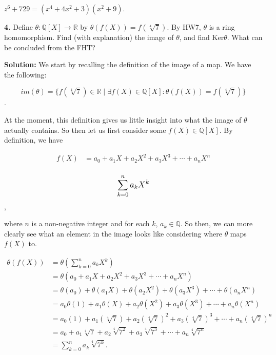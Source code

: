 \documentclass[12pt, a4paper]{article}
\begin{document}
\vspace{2mm}

\centerline{$z^6+729=(x^4+4x^2+3)(x^2+9)$.}

\newpage

\noindent\textbf{4.} Define $\theta\colon\mathbb{Q}[X]\rightarrow\mathbb{R}$ by $\theta(f(X))=f(\sqrt[4]{7})$. By HW7, $\theta$ is a ring homomorphism. Find (with explanation) the image of $\theta$, and find Ker$\theta$. What can be concluded from the FHT?

\vspace{4mm}

\noindent\textbf{Solution:} We start by recalling the definition of the image of a map. We have the following:

\vspace{2mm}

\centerline{\[ im(\theta)=\{f(\sqrt[4]{7})\in\mathbb{R}\mid\exists f(X)\in\mathbb{Q}[X]\colon\theta(f(X))=f(\sqrt[4]{7})\} \].}

\vspace{2mm}

At the moment, this definition gives us little insight into what the image of $\theta$ actually contains. So then let us first consider some $f(X)\in\mathbb{Q}[X]$. By definition, we have

     \begin{equation*}
        \begin{split}
            f(X) &= a_0 + a_1X + a_2X^2 + a_3X^3 +\cdots + a_nX^n \\
        \end{split}
    \end{equation*}
    
\centerline{\[ \mathlarger{\sum\limits_{k=0}^{n} a_k X^k} \],}

\vspace{8mm}

\noindent where $n$ is a non-negative integer and for each $k$, $a_k\in\mathbb{Q}$. So then, we can more clearly see what an element in the image looks like considering where $\theta$ maps $f(X)$ to. 

     \begin{equation*}
        \begin{split}
            \theta(f(X)) &= \theta(\sum\limits_{k=0}^{n} a_k X^k) \\
            &= \theta(a_0 + a_1X + a_2X^2 + a_3X^3 +\cdots + a_nX^n) \\
            &= \theta(a_0) + \theta(a_1 X) + \theta(a_2 X^2) + \theta(a_3 X^3) +\cdots +\theta(a_n X^n) \\
            &= a_0\theta(1) + a_1\theta(X) + a_2\theta(X^2) + a_3\theta(X^3) +\cdots +a_n\theta(X^n) \\
            &= a_0(1) + a_1(\sqrt[4]{7}) + a_2(\sqrt[4]{7})^2 + a_3(\sqrt[4]{7})^3 +\cdots +a_n(\sqrt[4]{7})^n \\
            &= a_0 + a_1\sqrt[4]{7}+a_2\sqrt[4]{7^2}+a_3\sqrt[4]{7^3}+\cdots+a_n\sqrt[4]{7^n} \\
            &= \sum\limits_{k=0}^{n} a_k\sqrt[4]{7^k}.
        \end{split}
    \end{equation*}
    
\end{document}
